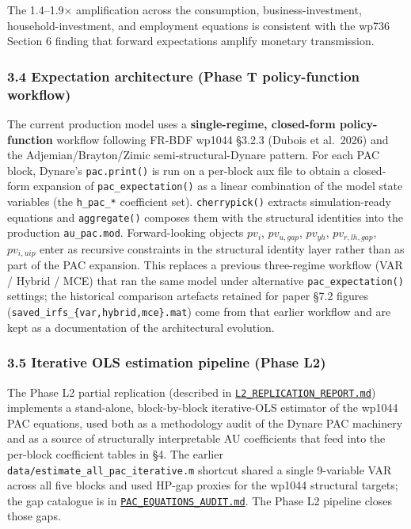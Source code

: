 \documentclass[
]{article}
\begin{document}
The 1.4--1.9× amplification across the consumption, business-investment,
household-investment, and employment equations is consistent with the
wp736 Section 6 finding that forward expectations amplify monetary
transmission.

\subsubsection{3.4 Expectation architecture (Phase T policy-function
workflow)}\label{expectation-architecture-phase-t-policy-function-workflow}

The current production model uses a \textbf{single-regime, closed-form
policy-function} workflow following FR-BDF wp1044 §3.2.3 (Dubois et
al.~2026) and the Adjemian/Brayton/Zimic semi-structural-Dynare pattern.
For each PAC block, Dynare's \texttt{pac.print()} is run on a per-block
aux file to obtain a closed-form expansion of
\texttt{pac\_expectation()} as a linear combination of the model state
variables (the \texttt{h\_pac\_*} coefficient set).
\texttt{cherrypick()} extracts simulation-ready equations and
\texttt{aggregate()} composes them with the structural identities into
the production \texttt{au\_pac.mod}. Forward-looking objects \(pv_i\),
\(pv_{u,gap}\), \(pv_{yh}\), \(pv_{r,lh,gap}\), \(pv_{i,uip}\) enter as
recursive constraints in the structural identity layer rather than as
part of the PAC expansion. This replaces a previous three-regime
workflow (VAR / Hybrid / MCE) that ran the same model under alternative
\texttt{pac\_expectation()} settings; the historical comparison
artefacts retained for paper §7.2 figures
(\texttt{saved\_irfs\_\{var,hybrid,mce\}.mat}) come from that earlier
workflow and are kept as a documentation of the architectural evolution.

\subsubsection{3.5 Iterative OLS estimation pipeline (Phase
L2)}\label{iterative-ols-estimation-pipeline-phase-l2}

The Phase L2 partial replication (described in
\href{../L2_REPLICATION_REPORT.md}{\texttt{L2\_REPLICATION\_REPORT.md}})
implements a stand-alone, block-by-block iterative-OLS estimator of the
wp1044 PAC equations, used both as a methodology audit of the Dynare PAC
machinery and as a source of structurally interpretable AU coefficients
that feed into the per-block coefficient tables in §4. The earlier
\texttt{data/estimate\_all\_pac\_iterative.m} shortcut shared a single
9-variable VAR across all five blocks and used HP-gap proxies for the
wp1044 structural targets; the gap catalogue is in
\href{../PAC_EQUATIONS_AUDIT.md}{\texttt{PAC\_EQUATIONS\_AUDIT.md}}. The
Phase L2 pipeline closes those gaps.
\end{document}
